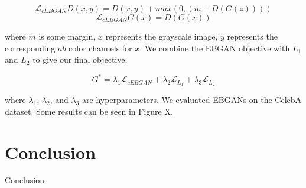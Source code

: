 \documentclass[10pt]{article}
\begin{document}
\[\mathcal{L}_{cEBGAN} D(x,y) = D(x,y) + max(0, (m-D(G(z)))) \]
\[\mathcal{L}_{cEBGAN} G(x) = D(G(x)) \]


\noindent where $m$ is some margin, $x$ represents the grayscale image, $y$ represents the corresponding
$ab$ color channels for $x$. We combine the EBGAN objective with $L_1$ and $L_2$ to give our final objective:

\[ G^* = \lambda_1 \mathcal{L}_{cEBGAN} + \lambda_2 \mathcal{L}_{L_1} + \lambda_3 \mathcal{L}_{L_2} \]

\noindent where $\lambda_1$, $\lambda_2$, and $\lambda_3$ are hyperparameters. We evaluated EBGANs on
the CelebA dataset. Some results can be seen in Figure X.



\section{Conclusion}
Conclusion

\vspace{1mm}

\footnotesize

\end{document}
